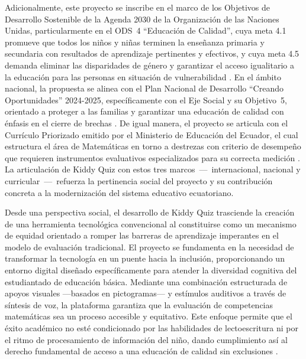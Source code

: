 Adicionalmente, este proyecto se inscribe en el marco de los Objetivos de Desarrollo Sostenible de la Agenda 2030 de la Organización de las Naciones Unidas, particularmente en el ODS~4 ``Educación de Calidad'', cuya meta 4.1 promueve que todos los niños y niñas terminen la enseñanza primaria y secundaria con resultados de aprendizaje pertinentes y efectivos, y cuya meta 4.5 demanda eliminar las disparidades de género y garantizar el acceso igualitario a la educación para las personas en situación de vulnerabilidad \cite{onu2015ods}. En el ámbito nacional, la propuesta se alinea con el Plan Nacional de Desarrollo ``Creando Oportunidades'' 2024-2025, específicamente con el Eje Social y su Objetivo~5, orientado a proteger a las familias y garantizar una educación de calidad con énfasis en el cierre de brechas \cite{senplades2024pnd}. De igual manera, el proyecto se articula con el Currículo Priorizado emitido por el Ministerio de Educación del Ecuador, el cual estructura el área de Matemáticas en torno a destrezas con criterio de desempeño que requieren instrumentos evaluativos especializados para su correcta medición \cite{mineduc2021curriculo}. La articulación de Kiddy Quiz con estos tres marcos~---~internacional, nacional y curricular~---~refuerza la pertinencia social del proyecto y su contribución concreta a la modernización del sistema educativo ecuatoriano.

Desde una perspectiva social, el desarrollo de Kiddy Quiz trasciende la
creación de una herramienta tecnológica convencional al constituirse como
un mecanismo de equidad orientado a romper las barreras de aprendizaje
imperantes en el modelo de evaluación tradicional. El proyecto se
fundamenta en la necesidad de transformar la tecnología en un puente
hacia la inclusión, proporcionando un entorno digital diseñado
específicamente para atender la diversidad cognitiva del estudiantado
de educación básica. Mediante una combinación estructurada de apoyos
visuales ---basados en pictogramas--- y estímulos auditivos a través de
síntesis de voz, la plataforma garantiza que la evaluación de
competencias matemáticas sea un proceso accesible y equitativo. Este
enfoque permite que el éxito académico no esté condicionado por las
habilidades de lectoescritura ni por el ritmo de procesamiento de
información del niño, dando cumplimiento así al derecho fundamental de
acceso a una educación de calidad sin exclusiones
\cite{unesco2017inclusion,mineduc2023dua}.